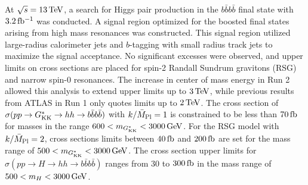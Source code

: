 At $\sqrt{s} = 13 \TeV$, a search for Higgs pair production in the $b\bar{b}b\bar{b}$ final state with $3.2\mbox{\,fb$^{-1}$}$ was conducted. A signal region optimized for the boosted final states arising from high mass resonances was constructed. This signal region utilized large-radius calorimeter jets and $b$-tagging with small radius track jets to maximize the signal acceptance. No significant excesses were observed, and upper limits on cross sections are placed for spin-2 Randall Sundrum gravitons (RSG) and narrow spin-0 resonances. The increase in center of mass energy in Run 2 allowed this analysis to extend upper limits up to $3 \TeV$, while previous results from ATLAS in Run 1 only quotes limits up to $2 \TeV$. The cross section of $\sigma(pp \to G^*_{\rm KK} \to hh \to b\bar{b}b\bar{b})$ with $k/\bar{M}_{\rm Pl}=1$ is constrained to be less than $70 \mbox{\,fb}$ for masses in the range $600 < m_{\Gkk} < 3000 \GeV$. For the RSG model with $k/\bar{M}_{\rm Pl}=2$, cross sections limits between $40\mbox{\,fb}$ and $200 \mbox{\,fb}$ are set for the mass range of $500 < m_{\Gkk} < 3000 \GeV$. The cross section upper limits for $\sigma(pp \to H \to hh \to b\bar{b}b\bar{b})$ ranges from $30$ to $300 \mbox{\,fb}$ in the mass range of $500 < m_{H} < 3000 \GeV$. 



